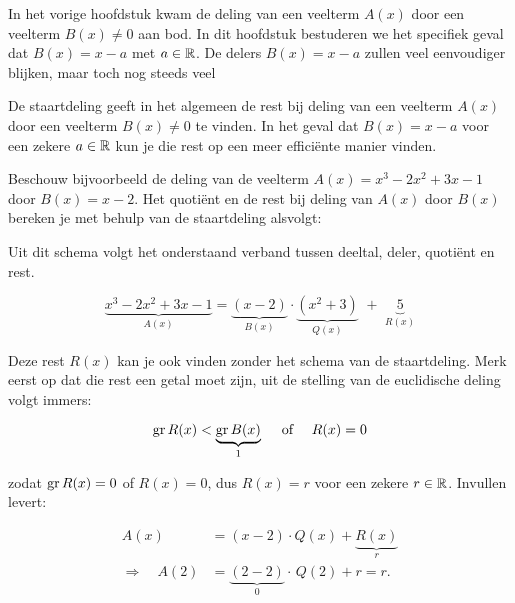 \documentclass{ximera}
\begin{document}
	\author{Koen de Naeghel - Wiskunde Op Maat}
    \xmsource

In het vorige hoofdstuk kwam de deling van een veelterm $A(x)$ door een veelterm $B(x) \neq 0$ aan bod. In dit hoofdstuk bestuderen we het specifiek geval dat $B(x) = x-a$ met $a \in \mathbb{R}$. De delers $B(x) = x-a$ zullen veel eenvoudiger blijken, maar toch nog steeds veel 



De staartdeling geeft in het algemeen de rest bij deling van een veelterm $A(x)$ door een veelterm $B(x) \neq 0$ te vinden. In het geval dat $B(x) = x-a$ voor een zekere $a \in \mathbb{R}$ kun je die rest op een meer efficiënte manier vinden.

Beschouw bijvoorbeeld de deling van de veelterm $A(x) = x^3-2x^2+3x-1$ door $B(x) = x-2$. Het quotiënt en de rest bij deling van $A(x)$ door $B(x)$ bereken je met behulp van de staartdeling alsvolgt:




Uit dit schema volgt het onderstaand verband tussen deeltal, deler, quotiënt en rest.

\[
\underbrace{x^3-2x^2+3x-1}_{A(x)} = \underbrace{(x-2)}_{B(x)}\cdot\underbrace{(x^2+3)}_{Q(x)} \,\, + \,\, \underbrace{5}_{R(x)} 
\]

Deze rest $R(x)$ kan je ook vinden zonder het schema van de staartdeling. Merk eerst op dat die rest een getal moet zijn, uit de stelling van de euclidische deling volgt immers: 

\[
\operatorname{gr} R(x) < \underbrace{\operatorname{gr} B(x)}_{1} \quad \text{ of } \quad R(x) = 0
\]

zodat $\operatorname{gr} R(x) = 0$ of $R(x) = 0$, dus $R(x) = r$ voor een zekere $r \in \mathbb{R}$. Invullen levert:

\begin{align*}
A(x) & = (x-2) \cdot Q(x) + \underbrace{R(x)}_{r} \\
\Rightarrow \quad A(2) & = \underbrace{(2-2)}_{0} \cdot \, Q(2) + r = r. 
\end{align*}
\end{document}
